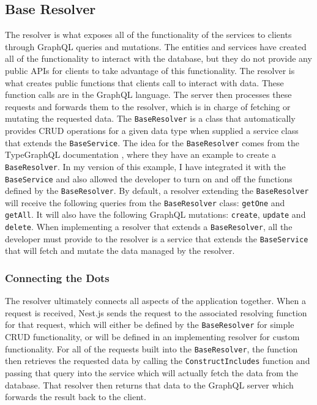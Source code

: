 \subsection{Base Resolver}
The resolver is what exposes all of the functionality of the services to clients through GraphQL queries and mutations. The entities and services have created all of the functionality to interact with the database, but they do not provide any public APIs for clients to take advantage of this functionality.  The resolver is what creates public functions that clients call to interact with data.  These function calls are in the GraphQL language.  The server then processes these requests and forwards them to the resolver, which is in charge of fetching or mutating the requested data.  The \verb!BaseResolver! is a class that automatically provides CRUD operations for a given data type when supplied a service class that extends the \verb!BaseService!. The idea for the \verb!BaseResolver! comes from the TypeGraphQL documentation \cite{lytekTypegraphql2019}, where they have an example to create a \verb!BaseResolver!.  In my version of this example, I have integrated it with the \verb!BaseService! and also allowed the developer to turn on and off the functions defined by the \verb!BaseResolver!. By default, a resolver extending the \verb!BaseResolver! will receive the following queries from the \verb!BaseResolver! class: \verb!getOne! and \verb!getAll!.  It will also have the following GraphQL mutations: \verb!create!, \verb!update! and \verb!delete!.  When implementing a resolver that extends a \verb!BaseResolver!, all the developer must provide to the resolver is a service that extends the \verb!BaseService! that will fetch and mutate the data managed by the resolver.

\subsubsection{Connecting the Dots}

The resolver ultimately connects all aspects of the application together.  When a request is received, Nest.js sends the request to the associated resolving function for that request, which will either be defined by the \verb!BaseResolver! for simple CRUD functionality, or will be defined in an implementing resolver for custom functionality.  For all of the requests built into the \verb!BaseResolver!, the function then retrieves the requested data by calling the \verb!ConstructIncludes! function and passing that query into the service which will actually fetch the data from the database.  That resolver then returns that data to the GraphQL server which forwards the result back to the client.

